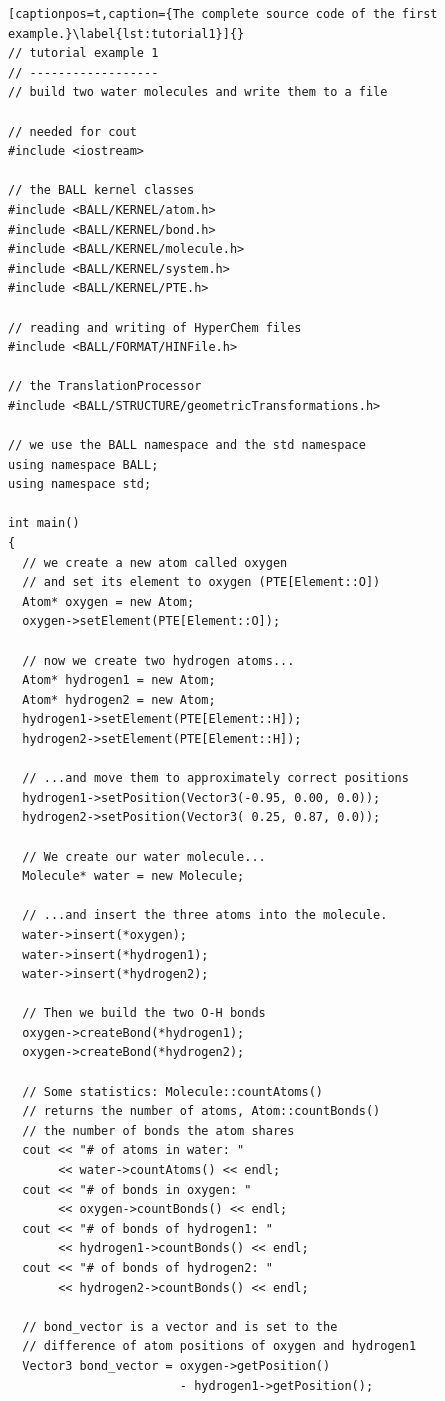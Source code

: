 \newpage
\begin{lstlisting}[captionpos=t,caption={The complete source code of the first example.}\label{lst:tutorial1}]{}
// tutorial example 1
// ------------------
// build two water molecules and write them to a file

// needed for cout
#include <iostream>

// the BALL kernel classes
#include <BALL/KERNEL/atom.h>
#include <BALL/KERNEL/bond.h>
#include <BALL/KERNEL/molecule.h>
#include <BALL/KERNEL/system.h>
#include <BALL/KERNEL/PTE.h>

// reading and writing of HyperChem files
#include <BALL/FORMAT/HINFile.h>

// the TranslationProcessor
#include <BALL/STRUCTURE/geometricTransformations.h>

// we use the BALL namespace and the std namespace
using namespace BALL;
using namespace std;

int main()
{
  // we create a new atom called oxygen
  // and set its element to oxygen (PTE[Element::O])
  Atom* oxygen = new Atom;
  oxygen->setElement(PTE[Element::O]);

  // now we create two hydrogen atoms...
  Atom* hydrogen1 = new Atom;
  Atom* hydrogen2 = new Atom;
  hydrogen1->setElement(PTE[Element::H]);
  hydrogen2->setElement(PTE[Element::H]);

  // ...and move them to approximately correct positions
  hydrogen1->setPosition(Vector3(-0.95, 0.00, 0.0));
  hydrogen2->setPosition(Vector3( 0.25, 0.87, 0.0));

  // We create our water molecule...
  Molecule* water = new Molecule;

  // ...and insert the three atoms into the molecule.
  water->insert(*oxygen);
  water->insert(*hydrogen1);
  water->insert(*hydrogen2);

  // Then we build the two O-H bonds
  oxygen->createBond(*hydrogen1);
  oxygen->createBond(*hydrogen2);

  // Some statistics: Molecule::countAtoms() 
  // returns the number of atoms, Atom::countBonds() 
  // the number of bonds the atom shares
  cout << "# of atoms in water: " 
       << water->countAtoms() << endl;
  cout << "# of bonds in oxygen: " 
       << oxygen->countBonds() << endl;
  cout << "# of bonds of hydrogen1: " 
       << hydrogen1->countBonds() << endl;
  cout << "# of bonds of hydrogen2: " 
       << hydrogen2->countBonds() << endl;

  // bond_vector is a vector and is set to the
  // difference of atom positions of oxygen and hydrogen1
  Vector3 bond_vector = oxygen->getPosition() 
                        - hydrogen1->getPosition();


\end{lstlisting}
